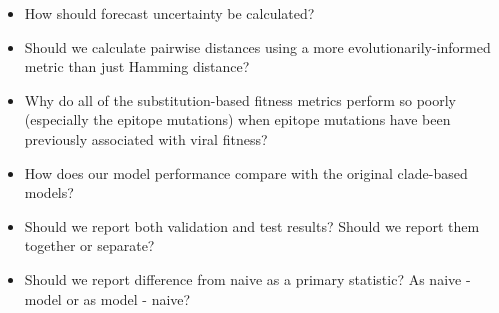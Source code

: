 \begin{itemize}
\item{How should forecast uncertainty be calculated?}
\item{Should we calculate pairwise distances using a more evolutionarily-informed metric than just Hamming distance?}
\item{Why do all of the substitution-based fitness metrics perform so poorly (especially the epitope mutations) when epitope mutations have been previously associated with viral fitness?}
\item{How does our model performance compare with the original clade-based models?}
\item{Should we report both validation and test results? Should we report them together or separate?}
\item{Should we report difference from naive as a primary statistic? As naive - model or as model - naive?}
\end{itemize}

